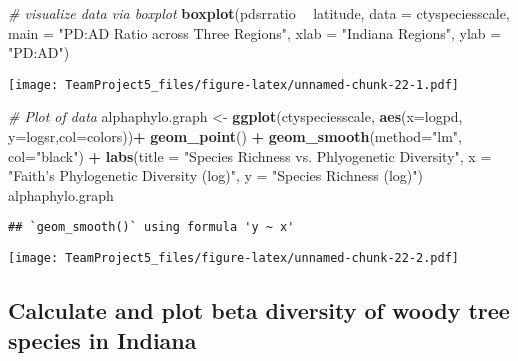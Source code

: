 \documentclass[
]{article}
\newenvironment{Shaded}{\begin{snugshade}}{\end{snugshade}}
\newcommand{\CommentTok}[1]{\textcolor[rgb]{0.56,0.35,0.01}{\textit{#1}}}
\newcommand{\DataTypeTok}[1]{\textcolor[rgb]{0.13,0.29,0.53}{#1}}
\newcommand{\KeywordTok}[1]{\textcolor[rgb]{0.13,0.29,0.53}{\textbf{#1}}}
\newcommand{\NormalTok}[1]{#1}
\newcommand{\OperatorTok}[1]{\textcolor[rgb]{0.81,0.36,0.00}{\textbf{#1}}}
\newcommand{\StringTok}[1]{\textcolor[rgb]{0.31,0.60,0.02}{#1}}
\begin{document}
\begin{Shaded}
\begin{Highlighting}[]
\CommentTok{# visualize data via boxplot}
\KeywordTok{boxplot}\NormalTok{(pdsrratio }\OperatorTok{~}\StringTok{ }\NormalTok{latitude, }\DataTypeTok{data =}\NormalTok{ ctyspeciesscale, }\DataTypeTok{main =} \StringTok{"PD:AD Ratio across Three Regions"}\NormalTok{,}
   \DataTypeTok{xlab =} \StringTok{"Indiana Regions"}\NormalTok{, }\DataTypeTok{ylab =} \StringTok{"PD:AD"}\NormalTok{)}
\end{Highlighting}
\end{Shaded}

\texttt{[image: TeamProject5\_files/figure-latex/unnamed-chunk-22-1.pdf]}

\begin{Shaded}
\begin{Highlighting}[]
\CommentTok{# Plot of data}
\NormalTok{alphaphylo.graph <-}\StringTok{ }\KeywordTok{ggplot}\NormalTok{(ctyspeciesscale, }\KeywordTok{aes}\NormalTok{(}\DataTypeTok{x=}\NormalTok{logpd, }\DataTypeTok{y=}\NormalTok{logsr,}\DataTypeTok{col=}\NormalTok{colors))}\OperatorTok{+}
\StringTok{                     }\KeywordTok{geom_point}\NormalTok{() }\OperatorTok{+}\StringTok{ }\KeywordTok{geom_smooth}\NormalTok{(}\DataTypeTok{method=}\StringTok{"lm"}\NormalTok{, }\DataTypeTok{col=}\StringTok{"black"}\NormalTok{) }\OperatorTok{+}\StringTok{ }\KeywordTok{labs}\NormalTok{(}\DataTypeTok{title =} \StringTok{"Species Richness vs. Phlyogenetic Diversity"}\NormalTok{,}
      \DataTypeTok{x =} \StringTok{"Faith's Phylogenetic Diversity (log)"}\NormalTok{,}
      \DataTypeTok{y =} \StringTok{"Species Richness (log)"}\NormalTok{)}
\NormalTok{alphaphylo.graph}
\end{Highlighting}
\end{Shaded}

\begin{verbatim}
## `geom_smooth()` using formula 'y ~ x'
\end{verbatim}

\texttt{[image: TeamProject5\_files/figure-latex/unnamed-chunk-22-2.pdf]}

\hypertarget{calculate-and-plot-beta-diversity-of-woody-tree-species-in-indiana}{%
\subsection{Calculate and plot beta diversity of woody tree species in
Indiana}\label{calculate-and-plot-beta-diversity-of-woody-tree-species-in-indiana}}
\end{document}
